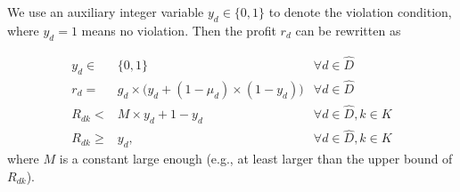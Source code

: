 \documentclass[sigconf]{acmart}
\begin{document}
We use an auxiliary integer variable $y_d \in \{0, 1\}$ to denote the violation condition, 
where $y_d=1$ means no violation. 
Then the profit $r_d$ can be rewritten as 

\begin{equation}
\label{A-SSS2}
\begin{array}{rll}
y_d \in &\!\!\{0,1\} &{\forall d \in \hat{D}} \\
r_d  = &\!\! g_d \times \Big(y_d+(1-\mu_{d})\times (1-y_d)\Big) &{\forall d \in \hat{D}} \\
R_{dk} < &\!\! M\times y_d+1-y_d &{\forall d \in \hat{D},  k\in K} \\
R_{dk} \ge &\!\!  y_d, &{\forall d \in \hat{D},  k\in K}
\end{array}
\end{equation}
where $M$ is a constant large enough (e.g., at least larger than the upper bound of $R_{dk}$).
\end{document}
